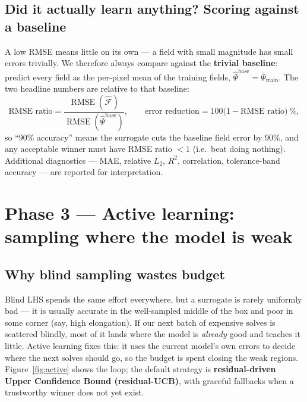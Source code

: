 \documentclass[11pt]{article}
\newcommand{\Fhat}{\hat{\mathcal{F}}}
\DeclareMathOperator{\RMSE}{RMSE}
\begin{document}
\subsection{Did it actually learn anything? Scoring against a baseline}
A low RMSE means little on its own --- a field with small magnitude has small errors trivially. We
therefore always compare against the \textbf{trivial baseline}: predict every field as the
per-pixel mean of the training fields, $\hat\Psi^{\text{base}}=\bar\Psi_{\text{train}}$. The two
headline numbers are relative to that baseline:
\begin{equation}
\text{RMSE ratio}=\frac{\RMSE(\Fhat)}{\RMSE(\hat\Psi^{\text{base}})},
\qquad
\text{error reduction}=100\big(1-\text{RMSE ratio}\big)\ \%,
\end{equation}
so ``90\% accuracy'' means the surrogate cuts the baseline field error by 90\%, and any acceptable
winner must have RMSE ratio $<1$ (i.e.\ beat doing nothing). Additional diagnostics --- MAE,
relative $L_2$, $R^2$, correlation, tolerance-band accuracy --- are reported for interpretation.

\section{Phase 3 --- Active learning: sampling where the model is weak}

\subsection{Why blind sampling wastes budget}
Blind LHS spends the same effort everywhere, but a surrogate is rarely uniformly bad --- it is
usually accurate in the well-sampled middle of the box and poor in some corner (say, high
elongation). If our next batch of expensive solves is scattered blindly, most of it lands where the
model is \emph{already} good and teaches it little. Active learning fixes this: it uses the current
model's own errors to decide where the next solves should go, so the budget is spent closing the
weak regions. Figure~\ref{fig:active} shows the loop; the default strategy is \textbf{residual-driven
Upper Confidence Bound (residual-UCB)}, with graceful fallbacks when a trustworthy winner does not
yet exist.
\end{document}

